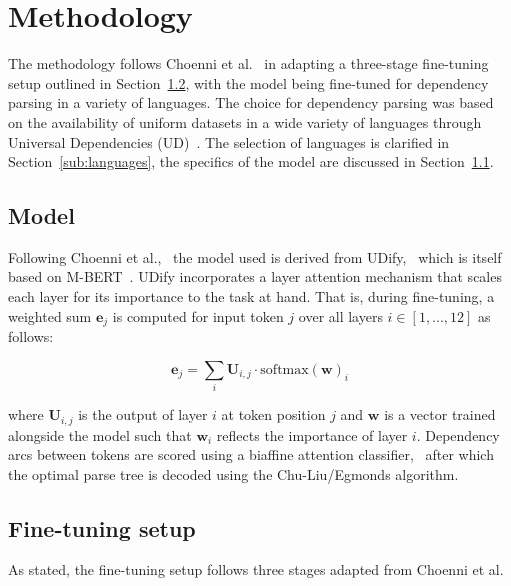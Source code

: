 
\section{Methodology}
\label{sec:methodology}

The methodology follows Choenni et al.~\cite{choenni-etal-2023-cross} in adapting a three-stage fine-tuning setup outlined in Section~\ref{sub:training_setup}, with the model being fine-tuned for dependency parsing in a variety of languages. The choice for dependency parsing was based on the availability of uniform datasets in a wide variety of languages through Universal Dependencies (UD)~\cite{nivre-etal-2016-universal}. The selection of languages is clarified in Section~\ref{sub:languages}, the specifics of the model are discussed in Section~\ref{sub:model}.

\subsection{Model}
\label{sub:model}
	Following Choenni et al.,~\cite{choenni-etal-2023-cross} the model used is derived from UDify,~\cite{kondratyuk-straka-2019-75} which is itself based on M-BERT~\cite{devlin-etal-2019-bert}. UDify incorporates a layer attention mechanism that scales each layer for its importance to the task at hand. That is, during fine-tuning, a weighted sum $\mathbf{e}_j$ is computed for input token $j$ over all layers $i \in [1, ..., 12]$ as follows:

	$$
		\mathbf{e}_j = \sum_i\mathbf{U}_{i,j} \cdot \text{softmax}(\mathbf{w})_i
	$$

	\noindent where $\mathbf{U}_{i,j}$ is the output of layer $i$ at token position $j$ and $\mathbf{w}$ is a vector trained alongside the model such that $\mathbf{w}_i$ reflects the importance of layer $i$. Dependency arcs between tokens are scored using a biaffine attention classifier,~\cite{dozat-manning-2016-deep} after which the optimal parse tree is decoded using the Chu-Liu/Egmonds algorithm.~\cite{chu-1965-shortest}


\subsection{Fine-tuning setup}
\label{sub:training_setup}
	As stated, the fine-tuning setup follows three stages adapted from Choenni et al.~\cite{choenni-etal-2023-cross}

